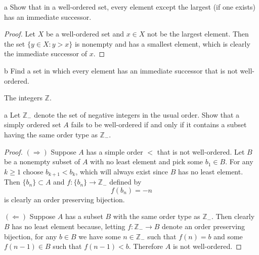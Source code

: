 \documentclass[11pt]{article}
\begin{document}



\begin{ex}{10.2}
\end{ex}

\begin{p}{a}
  Show that in a well-ordered set, every element except the largest (if one
  exists) has an immediate successor.
\end{p}

\begin{proof}
  Let $X$ be a well-ordered set and $x \in X$ not be the largest element. Then
  the set $\{y \in X : y > x\}$ is nonempty and has a smallest element, which is
  clearly the immediate successor of $x$.
\end{proof}

\begin{p}{b}
  Find a set in which every element has an immediate successor that is not
  well-ordered.
\end{p}

\begin{solution}
  The integers $\mathbb{Z}$.
\end{solution}

\begin{ex}{10.4}
\end{ex}

\begin{p}{a}
  Let $\mathbb{Z}_-$ denote the set of negative integers in the usual order.
  Show that a simply ordered set $A$ fails to be well-ordered if and only if it
  contains a subset having the same order type as $\mathbb{Z}_-$.
\end{p}

\begin{proof}
  $(\Longrightarrow)$ Suppose $A$ has a simple order $<$ that is not
  well-ordered. Let $B$ be a nonempty subset of $A$ with no least element and
  pick some $b_1 \in B$. For any $k \geq 1$ choose $b_{k+1} < b_k$, which will
  always exist since $B$ has no least element. Then $\{b_n\} \subset A$ and $f:
  \{b_n\} \to \mathbb{Z}_-$ defined by
  \[ f(b_n) = -n \]
  is clearly an order preserving bijection.

  $(\Longleftarrow)$ Suppose $A$ has a subset $B$ with the same order type as
  $\mathbb{Z}_-$. Then clearly $B$ has no least element because, letting $f:
  \mathbb{Z}_- \to B$ denote an order preserving bijection, for any $b \in B$ we
  have some $n \in \mathbb{Z}_-$ such that $f(n) = b$ and some $f(n-1) \in B$
  such that $f(n-1) < b$. Therefore $A$ is not well-ordered.
\end{proof}
\end{document}
